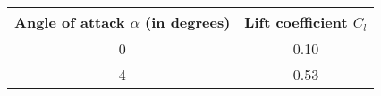 \begin{tabular}{|c|c|}
    \hline
    Angle of attack $\alpha$ (in degrees) & Lift coefficient $C_l$ \\ \hline
    0 & 0.10 \\ \hline
    4 & 0.53 \\ \hline
\end{tabular}